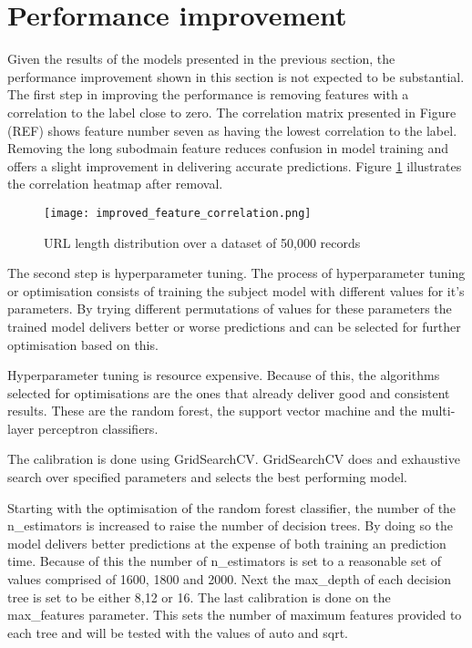 \section{Performance improvement}
Given the results of the models presented in the previous section, the performance improvement shown in this section is not expected to be substantial.
The first step in improving the performance is removing features with a correlation to the label close to zero. The correlation matrix presented in Figure (REF) shows feature number seven as having the lowest correlation to the label. Removing the long subodmain feature reduces confusion in model training and offers a slight improvement in delivering accurate predictions. Figure \ref{fig:IMPROVED_FEATURE_CORRELATION} illustrates the correlation heatmap after removal.

\begin{figure}[t]
	\centering
	\texttt{[image: improved\_feature\_correlation.png]}
	\caption{URL length distribution over a dataset of 50,000 records}
	\label{fig:IMPROVED_FEATURE_CORRELATION}
\end{figure}

The second step is hyperparameter tuning. The process of hyperparameter tuning or optimisation consists of training the subject model with different values for it's parameters. By trying different permutations of values for these parameters the trained model delivers better or worse predictions and can be selected for further optimisation based on this.

Hyperparameter tuning is resource expensive. Because of this, the algorithms selected for optimisations are the ones that already deliver good and consistent results. These are the random forest, the support vector machine and the multi-layer perceptron classifiers.

The calibration is done using GridSearchCV. GridSearchCV does and exhaustive search over specified parameters and selects the best performing model. 

Starting with the optimisation of the random forest classifier, the number of the n\_estimators is increased to raise the number of decision trees. By doing so the model delivers better predictions at the expense of both training an prediction time. Because of this the number of n\_estimators is set to a reasonable set of values comprised of 1600, 1800 and 2000. Next the max\_depth of each decision tree is set to be either 8,12 or 16. The last calibration is done on the max\_features parameter. This sets the number of maximum features provided to each tree and will be tested with the values of auto and sqrt.

